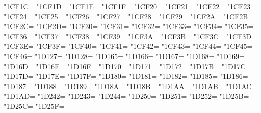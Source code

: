 \XeTeXcharclass"1CF1C=\KclassCM
\XeTeXcharclass"1CF1D=\KclassCM
\XeTeXcharclass"1CF1E=\KclassCM
\XeTeXcharclass"1CF1F=\KclassCM
\XeTeXcharclass"1CF20=\KclassCM
\XeTeXcharclass"1CF21=\KclassCM
\XeTeXcharclass"1CF22=\KclassCM
\XeTeXcharclass"1CF23=\KclassCM
\XeTeXcharclass"1CF24=\KclassCM
\XeTeXcharclass"1CF25=\KclassCM
\XeTeXcharclass"1CF26=\KclassCM
\XeTeXcharclass"1CF27=\KclassCM
\XeTeXcharclass"1CF28=\KclassCM
\XeTeXcharclass"1CF29=\KclassCM
\XeTeXcharclass"1CF2A=\KclassCM
\XeTeXcharclass"1CF2B=\KclassCM
\XeTeXcharclass"1CF2C=\KclassCM
\XeTeXcharclass"1CF2D=\KclassCM
\XeTeXcharclass"1CF30=\KclassCM
\XeTeXcharclass"1CF31=\KclassCM
\XeTeXcharclass"1CF32=\KclassCM
\XeTeXcharclass"1CF33=\KclassCM
\XeTeXcharclass"1CF34=\KclassCM
\XeTeXcharclass"1CF35=\KclassCM
\XeTeXcharclass"1CF36=\KclassCM
\XeTeXcharclass"1CF37=\KclassCM
\XeTeXcharclass"1CF38=\KclassCM
\XeTeXcharclass"1CF39=\KclassCM
\XeTeXcharclass"1CF3A=\KclassCM
\XeTeXcharclass"1CF3B=\KclassCM
\XeTeXcharclass"1CF3C=\KclassCM
\XeTeXcharclass"1CF3D=\KclassCM
\XeTeXcharclass"1CF3E=\KclassCM
\XeTeXcharclass"1CF3F=\KclassCM
\XeTeXcharclass"1CF40=\KclassCM
\XeTeXcharclass"1CF41=\KclassCM
\XeTeXcharclass"1CF42=\KclassCM
\XeTeXcharclass"1CF43=\KclassCM
\XeTeXcharclass"1CF44=\KclassCM
\XeTeXcharclass"1CF45=\KclassCM
\XeTeXcharclass"1CF46=\KclassCM
\XeTeXcharclass"1D127=\KclassCM
\XeTeXcharclass"1D128=\KclassCM
\XeTeXcharclass"1D165=\KclassCM
\XeTeXcharclass"1D166=\KclassCM
\XeTeXcharclass"1D167=\KclassCM
\XeTeXcharclass"1D168=\KclassCM
\XeTeXcharclass"1D169=\KclassCM
\XeTeXcharclass"1D16D=\KclassCM
\XeTeXcharclass"1D16E=\KclassCM
\XeTeXcharclass"1D16F=\KclassCM
\XeTeXcharclass"1D170=\KclassCM
\XeTeXcharclass"1D171=\KclassCM
\XeTeXcharclass"1D172=\KclassCM
\XeTeXcharclass"1D17B=\KclassCM
\XeTeXcharclass"1D17C=\KclassCM
\XeTeXcharclass"1D17D=\KclassCM
\XeTeXcharclass"1D17E=\KclassCM
\XeTeXcharclass"1D17F=\KclassCM
\XeTeXcharclass"1D180=\KclassCM
\XeTeXcharclass"1D181=\KclassCM
\XeTeXcharclass"1D182=\KclassCM
\XeTeXcharclass"1D185=\KclassCM
\XeTeXcharclass"1D186=\KclassCM
\XeTeXcharclass"1D187=\KclassCM
\XeTeXcharclass"1D188=\KclassCM
\XeTeXcharclass"1D189=\KclassCM
\XeTeXcharclass"1D18A=\KclassCM
\XeTeXcharclass"1D18B=\KclassCM
\XeTeXcharclass"1D1AA=\KclassCM
\XeTeXcharclass"1D1AB=\KclassCM
\XeTeXcharclass"1D1AC=\KclassCM
\XeTeXcharclass"1D1AD=\KclassCM
\XeTeXcharclass"1D242=\KclassCM
\XeTeXcharclass"1D243=\KclassCM
\XeTeXcharclass"1D244=\KclassCM
\XeTeXcharclass"1D250=\KclassCM
\XeTeXcharclass"1D251=\KclassCM
\XeTeXcharclass"1D252=\KclassCM
\XeTeXcharclass"1D25B=\KclassCM
\XeTeXcharclass"1D25C=\KclassCM
\XeTeXcharclass"1D25F=\KclassCM
